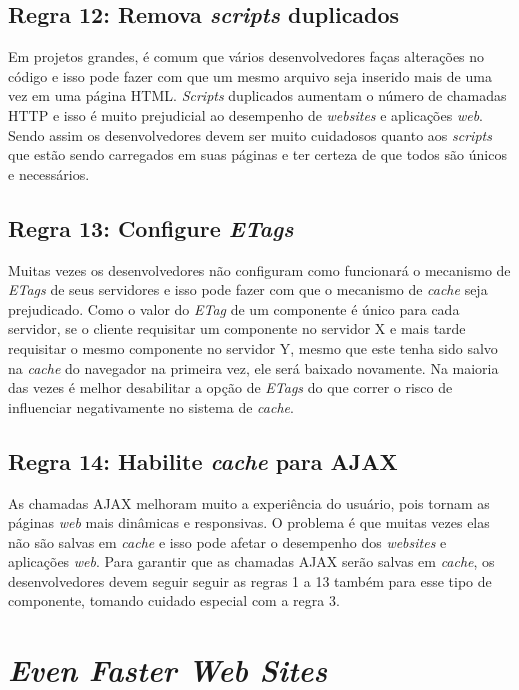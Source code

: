 \subsection{Regra 12: Remova \textit{scripts} duplicados}
\label{subsec:highperformance_regra12}
Em projetos grandes, é comum que vários desenvolvedores faças alterações no código e isso pode fazer com que um mesmo arquivo seja inserido mais de uma vez em uma página HTML. \textit{Scripts} duplicados aumentam o número de chamadas HTTP e isso é muito prejudicial ao desempenho de \textit{websites} e aplicações \textit{web}. Sendo assim os desenvolvedores devem ser muito cuidadosos quanto aos \textit{scripts} que estão sendo carregados em suas páginas e ter certeza de que todos são únicos e necessários.

\subsection{Regra 13: Configure \textit{ETags}}
\label{subsec:highperformance_regra13}
Muitas vezes os desenvolvedores não configuram como funcionará o mecanismo de \textit{ETags} de seus servidores e isso pode fazer com que o mecanismo de \textit{cache} seja prejudicado. Como o valor do \textit{ETag} de um componente é único para cada servidor, se o cliente requisitar um componente no servidor X e mais tarde requisitar o mesmo componente no servidor Y, mesmo que este tenha sido salvo na \textit{cache} do navegador na primeira vez, ele será baixado novamente. Na maioria das vezes é melhor desabilitar a opção de \textit{ETags} do que correr o risco de influenciar negativamente no sistema de \textit{cache}.

\subsection{Regra 14: Habilite \textit{cache} para AJAX}
\label{subsec:highperformance_regra14}
As chamadas AJAX melhoram muito a experiência do usuário, pois tornam as páginas \textit{web} mais dinâmicas e responsivas. O problema é que muitas vezes elas não são salvas em \textit{cache} e isso pode afetar o desempenho dos \textit{websites} e aplicações \textit{web}. Para garantir que as chamadas AJAX serão salvas em \textit{cache}, os desenvolvedores devem seguir seguir as regras 1 a 13 também para esse tipo de componente, tomando cuidado especial com a regra 3.

\section{\textit{Even Faster Web Sites}}
\label{sec:evenfasterwebsites}


